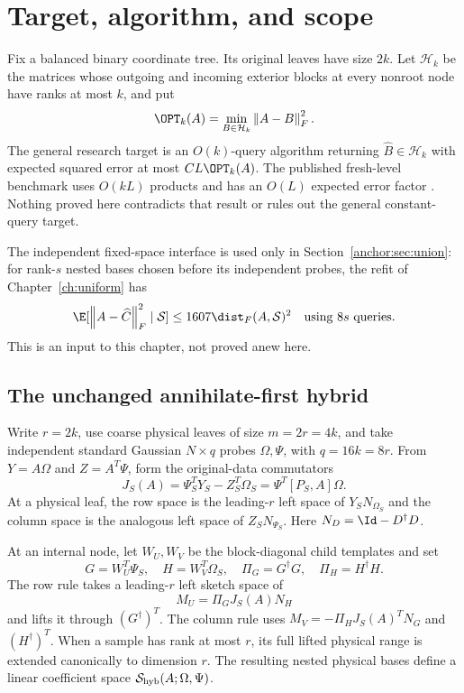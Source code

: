 \documentclass[11pt,oneside,openany,a4paper]{book}
\numberwithin{equation}{chapter}
\theoremstyle{definition}
\theoremstyle{remark}
\newcommand{\F}[1]{\left\lVert#1\right\rVert_F}
\newcommand{\HH}{\mathcal H}\newcommand{\SSS}{\mathcal S}
\begin{document}
\section{Target, algorithm, and scope}
Fix a balanced binary coordinate tree. Its original leaves have size $2k$. Let $\HH_k$ be the matrices whose outgoing and incoming exterior blocks at every nonroot node have ranks at most $k$, and put
\[
 \OPT_k(A)=\min_{B\in\HH_k}\F{A-B}^2.
\]
The general research target is an $O(k)$-query algorithm returning $\widehat B\in\HH_k$ with expected squared error at most $CL\OPT_k(A)$. The published fresh-level benchmark uses $O(kL)$ products and has an $O(L)$ expected error factor \cite{AmselHSS}. Nothing proved here contradicts that result or rules out the general constant-query target.

The independent fixed-space interface is used only in Section~\ref{anchor:sec:union}: for rank-$s$ nested bases chosen before its independent probes, the refit of Chapter~\ref{ch:uniform} has
\begin{equation}\label{anchor:eq:refit}
 \E[\F{A-\widehat C}^2\mid\SSS]\le1607\dist_F(A,\SSS)^2
 \quad\text{using }8s\text{ queries}.
\end{equation}
This is an input to this chapter, not proved anew here.

\subsection{The unchanged annihilate-first hybrid}
Write $r=2k$, use coarse physical leaves of size $m=2r=4k$, and take independent standard Gaussian $N\times q$ probes $\Omega,\Psi$, with $q=16k=8r$. From $Y=A\Omega$ and $Z=A^T\Psi$, form the original-data commutators
\begin{equation}\label{anchor:eq:J}
 J_S(A)=\Psi_S^TY_S-Z_S^T\Omega_S=\Psi^T[P_S,A]\Omega.
\end{equation}
At a physical leaf, the row space is the leading-$r$ left space of $Y_SN_{\Omega_S}$ and the column space is the analogous left space of $Z_SN_{\Psi_S}$. Here $N_D=\Id-D^\dagger D$.

At an internal node, let $W_U,W_V$ be the block-diagonal child templates and set
\[
 G=W_U^T\Psi_S,\quad H=W_V^T\Omega_S,\quad
 \Pi_G=G^\dagger G,\quad\Pi_H=H^\dagger H.
\]
The row rule takes a leading-$r$ left sketch space of
\begin{equation}\label{anchor:eq:hybrid}
 M_U=\Pi_GJ_S(A)N_H
\end{equation}
and lifts it through $(G^\dagger)^T$. The column rule uses
$M_V=-\Pi_HJ_S(A)^TN_G$ and $(H^\dagger)^T$. When a sample has rank at most $r$, its full lifted physical range is extended canonically to dimension $r$. The resulting nested physical bases define a linear coefficient space $\SSS_{\rm hyb}(A;\Omega,\Psi)$.
\end{document}
